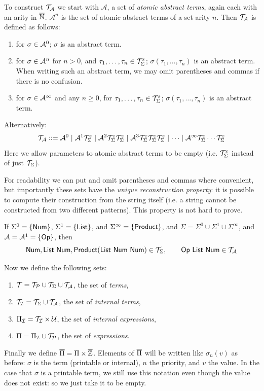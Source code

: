 \documentclass{llncs}
\begin{document}
To construct $\mathcal T_{\mathcal A}$ we start with $\mathcal A$, a set of \textit{atomic abstract terms}, again each with an arity in $\overline{\mathbb N}$.
$\mathcal A^n$ is the set of atomic abstract terms of a set arity $n$.
Then $\mathcal T_{\mathcal A}$ is defined as follows:
\begin{enumerate}
    \item for $\sigma\in\mathcal{A}^0$; $\sigma$ is an abstract term.
    \item for $\sigma\in\mathcal{A}^n$ for $n>0$, and $\tau_1,\dots,\tau_n\in\mathcal T_{\Sigma}^\varepsilon$; $\sigma(\tau_1,\dots,\tau_n)$ is an abstract term.
        When writing such an abstract term, we may omit parentheses and commas if there is no confusion.
    \item for $\sigma\in\mathcal{A}^\infty$ and any $n\geq0$, for $\tau_1,\dots,\tau_n\in\mathcal T_{\Sigma}^\varepsilon$; $\sigma(\tau_1,\dots,\tau_n)$ is an abstract term.
\end{enumerate}
Alternatively:
\[ \mathcal T_{\mathcal A} \mathrel{{\mathop:}{\mathop:}{=}} \mathcal A^0\mid\mathcal A^1\mathcal T_{\Sigma}^\varepsilon\mid\mathcal A^2\mathcal T_{\Sigma}^\varepsilon\mathcal T_{\Sigma}^\varepsilon\mid\mathcal A^3\mathcal T_{\Sigma}^\varepsilon\mathcal T_{\Sigma}^\varepsilon\mathcal T_{\Sigma}^\varepsilon\mid\cdots\mid
\mathcal A^\infty\mathcal T_{\Sigma}^\varepsilon\cdots\mathcal T_{\Sigma}^\varepsilon \]
Here we allow parameters to atomic abstract terms to be empty (i.e. $\mathcal T_{\Sigma}^\varepsilon$ instead of just $\mathcal T_{\Sigma}$).

For readability we can put and omit parentheses and commas where convenient, but importantly these sets have the \textit{unique reconstruction property}:
it is possible to compute their construction from the string itself (i.e. a string cannot be constructed from two different patterns).
This property is not hard to prove.

\begin{example}

    If $\Sigma^{0}=\{\mathsf{Num}\}$, $\Sigma^{1}=\{\mathsf{List}\}$, and $\Sigma^{\infty}=\{\mathsf{Product}\}$, and $\Sigma=\Sigma^0\cup\Sigma^1\cup\Sigma^\infty$, and $\c A=\mathcal A^1=\set{\OP}$, 
    then
    \[ \NUM,\LIST\ \NUM,\PRODUCT(\LIST\ \NUM\ \NUM)\in\terms,\qquad \OP\ \LIST\ \NUM\in\terma \]

\end{example}

Now we define the following sets:
\begin{enumerate}
    \item $\mathcal T=\mathcal T_{\mathcal P}\cup\mathcal T_{\Sigma}\cup\mathcal T_{\mathcal A}$, the set of \textit{terms},
    \item $\mathcal T_{\mathcal I}=\mathcal T_{\Sigma}\cup\mathcal T_{\mathcal A}$, the set of \textit{internal terms},
    \item $\Pi_{\mathcal I}=\mathcal T_{\mathcal I}\times\mathcal U$, the set of \textit{internal expressions},
    \item $\Pi=\Pi_{\mathcal I}\cup\mathcal T_{\mathcal P}$, the set of \textit{expressions}.
\end{enumerate}
Finally we define $\overline{\Pi}=\Pi\times\overline{\mathbb Z}$.
Elements of $\overline{\Pi}$ will be written like $\sigma_n(v)$ as before: $\sigma$ is the term (printable or internal), $n$ the priority, and $v$ the value.
In the case that $\sigma$ is a printable term, we still use this notation even though the value does not exist: so we just take it to be empty.
\end{document}
